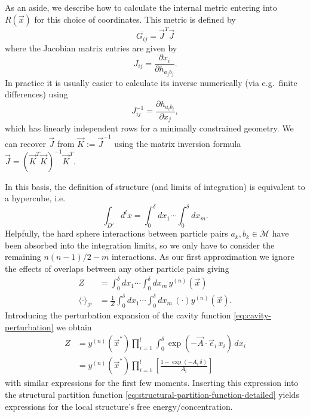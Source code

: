 \documentclass[11pt,twoside]{report}
\begin{document}
As an aside, we describe how to calculate the internal metric entering into $R(\vec{x})$ for this choice of coordinates.
This metric is defined by
\begin{equation*}
  \overline{G_{ij}} = \vec{J}^T \vec{J}
\end{equation*}
where the Jacobian matrix entries are given by
\begin{equation*}
  J_{ij} = \frac{\partial x_i}{\partial h_{a_j b_j}}.
\end{equation*}
In practice it is usually easier to calculate its inverse numerically (via e.g.\ finite differences) using
\begin{equation*}
  J_{ij}^{-1} = \frac{\partial h_{a_i b_i}}{\partial x_j},
\end{equation*}
which has linearly independent rows for a minimally constrained geometry.
We can recover $\vec{J}$ from $\vec{K} := \vec{J}^{-1}$ using the matrix inversion formula $\vec{J} = (\vec{K}^T\vec{K})^{-1} \vec{K}^T$.

In this basis, the definition of structure (and limits of integration) is equivalent to a hypercube, i.e.\
\begin{equation*}
  \int_{D'} d^l x
  =
  \int_0^\delta dx_1 \cdots \int_0^\delta dx_m.
\end{equation*}
Helpfully, the hard sphere interactions between particle pairs $a_k,b_k \in \mathcal{M}$ have been absorbed into the integration limits, so we only have to consider the remaining $n(n-1)/2 - m$ interactions.
As our first approximation we ignore the effects of overlaps between any other particle pairs giving
\begin{subequations}
  \begin{align}
    Z
    &=
    \int_0^\delta dx_1 \cdots \int_0^\delta dx_m
    \, y^{(n)}(\vec{x})
    \\
    \langle \cdot \rangle_\mathcal{P}
    &=
    \frac{1}{Z}
    \int_0^\delta dx_1 \cdots \int_0^\delta dx_m
    \, (\cdot) y^{(n)}(\vec{x}).
  \end{align}
\end{subequations}
Introducing the perturbation expansion of the cavity function \eqref{eq:cavity-perturbation} we obtain
\begin{equation}
  \begin{split}
    Z
    &=
    y^{(n)}(\vec{x}^*)
    \prod_{i=1}^l
    \int_0^\delta
    \exp{\left( -\vec{A} \cdot \vec{e}_i \, x_i \right)}
    \, dx_i
    \\ &=
    y^{(n)}(\vec{x}^*)
    \prod_{i=1}^l
    \left[
    \frac{1 - \exp{\left( -A_i \, \delta \right)}}{A_i}
    \right]
  \end{split}
\end{equation}
with similar expressions for the first few moments.
Inserting this expression into the structural partition function \eqref{eq:structural-partition-function-detailed} yields expressions for the local structure's free energy/concentration.
\end{document}
